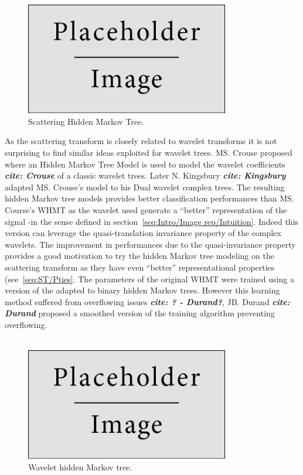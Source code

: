 \documentclass[a4paper,11pt]{report}
\begin{document}
{		\begin{figure}
				\begin{center}
					\includegraphics[width=3.5in]{placeholder.jpg}
					\caption{Scattering Hidden Markov Tree.} %
					\label{fig:SCHMT 1}
				\end{center}
		\end{figure}
		
		As the scattering transform is closely related to wavelet transforms it is not surprising to find similar ideas exploited for wavelet trees. MS. Crouse proposed where an Hidden Markov Tree Model is used to model the wavelet coefficients \textbf{\textit{cite: Crouse}} of a classic wavelet trees. Later N. Kingsbury \textbf{\textit{cite: Kingsbury}} adapted MS. Crouse's model to his Dual wavelet complex trees. The resulting hidden Markov tree models provides better classification performances than MS. Course's WHMT as the wavelet used generate a ``better'' representation of the signal -in the sense defined in section~\ref{seq:Intro/Image rep/Intuition}. Indeed this version can leverage the quasi-translation invariance property of the complex wavelets. The improvement in performances due to the quasi-invariance property provides a good motivation to try the hidden Markov tree modeling on the scattering transform as they have even ``better'' representational properties (see~\ref{seq:ST/Pties}. The parameters of the original WHMT were trained using a version of the  adapted to binary hidden Markov trees. However this learning method suffered from overflowing issues \textbf{\textit{cite: ? - Durand?}}, JB. Durand \textbf{\textit{cite: Durand}} proposed a smoothed version of the training algorithm preventing overflowing.\\\\
   
		\begin{figure}
				\begin{center}
					\includegraphics[width=3.5in]{placeholder.jpg}
					\caption{Wavelet hidden Markov tree.} %
					\label{fig:WHMT}
				\end{center}
		\end{figure}
	  
}
\end{document}

